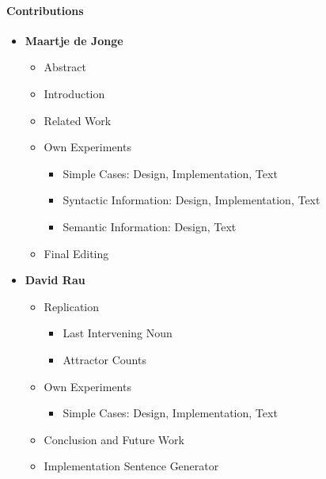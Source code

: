 \pagebreak

\paragraph{Contributions}

\begin{itemize}
  \item \textbf{Maartje de Jonge}
  \begin{itemize}
    \item Abstract
    \item Introduction
    \item Related Work
    \item Own Experiments
    \begin{itemize}
       \item Simple Cases: Design, Implementation, Text
       \item Syntactic Information: Design, Implementation, Text
       \item Semantic Information: Design, Text
    \end{itemize}
    \item Final Editing
  \end{itemize}

  \item \textbf{David Rau}
    \begin{itemize}
     \item Replication
      \begin{itemize}
         \item Last Intervening Noun
         \item Attractor Counts
      \end{itemize}    
     \item Own Experiments
    \begin{itemize}
       \item Simple Cases: Design, Implementation, Text
    \end{itemize}        
    \item Conclusion and Future Work
    \item Implementation Sentence Generator
  \end{itemize}


\end{itemize}


